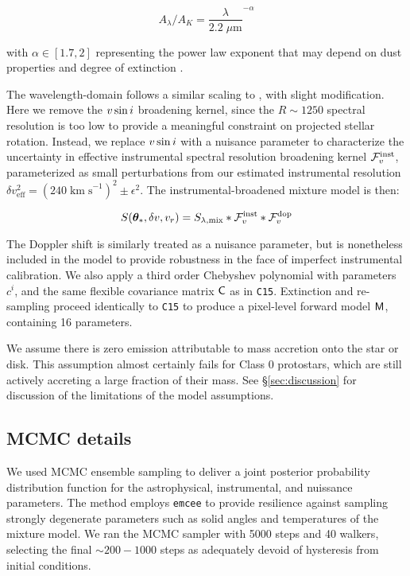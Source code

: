 \documentclass[twocolumn]{emulateapj}%
\begin{document}
$$ A_\lambda / A_K = \frac{\lambda}{2.2 \; \mu\mathrm{m}}^{-\alpha}$$

with $\alpha \in [1.7, 2]$ representing the power law exponent that may depend on dust properties and degree of extinction \citep{2005MNRAS.359..589M}.  

The wavelength-domain follows a similar scaling to \citet{czekala15}, with slight modification.  Here we remove the $v \sin i$ broadening kernel, since the $R\sim1250$ spectral resolution is too low to provide a meaningful constraint on projected stellar rotation.  Instead, we replace $v \sin i$ with a nuisance parameter to characterize the uncertainty in effective instrumental spectral resolution broadening kernel $\mathcal{F}_v^{\rm inst}$, parameterized as small perturbations from our estimated instrumental resolution $\delta v_{\mathrm{eff}}^2 = (240 \; \mathrm{km \;s}^{-1})^2 \pm \epsilon^2$.  The instrumental-broadened mixture model is then:

\begin{equation} \label{eqn:broadening}
S(\vt_{\ast}, \delta v, v_r) = S_{\lambda, \mathrm{mix}} \ast \mathcal{F}_v^{\rm inst} \ast \mathcal{F}_v^{\rm dop}
\end{equation} 

The Doppler shift is similarly treated as a nuisance parameter, but is nonetheless included in the model to provide robustness in the face of imperfect instrumental calibration.  We also apply a third order Chebyshev polynomial with parameters $c^i$, and the same flexible covariance matrix $\mathsf{C}$ as in \texttt{C15}.  Extinction and re-sampling proceed identically to \texttt{C15} to produce a pixel-level forward model $\mathsf{M}$, containing 16 parameters.

We assume there is zero emission attributable to mass accretion onto the star or disk.  This assumption almost certainly fails for Class 0 protostars, which are still actively accreting a large fraction of their mass.  See \S \ref{sec:discussion} for discussion of the limitations of the model assumptions.

\subsection{MCMC details}

We used MCMC ensemble sampling to deliver a joint posterior probability distribution function for the astrophysical, instrumental, and nuissance parameters.  The method employs \texttt{emcee} \citep{foreman13} to provide resilience against sampling strongly degenerate parameters such as solid angles and temperatures of the mixture model.  We ran the MCMC sampler with 5000 steps and 40 walkers, selecting the final $\sim200-1000$ steps as adequately devoid of hysteresis from initial conditions.
\end{document}
